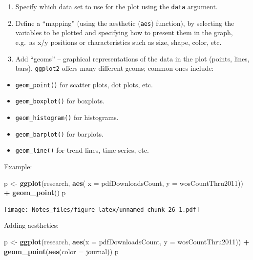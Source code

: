 \documentclass[
]{book}
\newenvironment{Shaded}{\begin{snugshade}}{\end{snugshade}}
\newcommand{\DataTypeTok}[1]{\textcolor[rgb]{0.13,0.29,0.53}{#1}}
\newcommand{\KeywordTok}[1]{\textcolor[rgb]{0.13,0.29,0.53}{\textbf{#1}}}
\newcommand{\NormalTok}[1]{#1}
\newcommand{\OperatorTok}[1]{\textcolor[rgb]{0.81,0.36,0.00}{\textbf{#1}}}
\newcommand{\StringTok}[1]{\textcolor[rgb]{0.31,0.60,0.02}{#1}}
\providecommand{\tightlist}{%
  \setlength{\itemsep}{0pt}\setlength{\parskip}{0pt}}
\begin{document}
\begin{enumerate}
\def\labelenumi{\arabic{enumi}.}
\item
  Specify which data set to use for the plot using the \texttt{data} argument.
\item
  Define a ``mapping'' (using the aesthetic (\texttt{aes}) function), by selecting the variables to be plotted and specifying how to present them in the graph, e.g.~as x/y positions or characteristics such as size, shape, color, etc.
\item
  Add ``geoms'' -- graphical representations of the data in the plot (points, lines, bars). \texttt{ggplot2} offers many different geoms; common ones include:
\end{enumerate}

\begin{itemize}
\tightlist
\item
  \texttt{geom\_point()} for scatter plots, dot plots, etc.
\item
  \texttt{geom\_boxplot()} for boxplots.
\item
  \texttt{geom\_histogram()} for histograms.
\item
  \texttt{geom\_barplot()} for barplots.
\item
  \texttt{geom\_line()} for trend lines, time series, etc.
\end{itemize}

Example:

\begin{Shaded}
\begin{Highlighting}[]
\NormalTok{p <-}\StringTok{ }\KeywordTok{ggplot}\NormalTok{(research, }\KeywordTok{aes}\NormalTok{( }\DataTypeTok{x =}\NormalTok{ pdfDownloadsCount, }\DataTypeTok{y =}\NormalTok{ wosCountThru2011)) }\OperatorTok{+}\StringTok{ }\KeywordTok{geom_point}\NormalTok{()}
\NormalTok{p}
\end{Highlighting}
\end{Shaded}

\texttt{[image: Notes\_files/figure-latex/unnamed-chunk-26-1.pdf]}

Adding aesthetics:

\begin{Shaded}
\begin{Highlighting}[]
\NormalTok{p <-}\StringTok{ }\KeywordTok{ggplot}\NormalTok{(research, }\KeywordTok{aes}\NormalTok{(}\DataTypeTok{x =}\NormalTok{ pdfDownloadsCount,}
                          \DataTypeTok{y =}\NormalTok{ wosCountThru2011)) }\OperatorTok{+}
\StringTok{  }\KeywordTok{geom_point}\NormalTok{(}\KeywordTok{aes}\NormalTok{(}\DataTypeTok{color =}\NormalTok{ journal))}
\NormalTok{p}
\end{Highlighting}
\end{Shaded}
\end{document}
